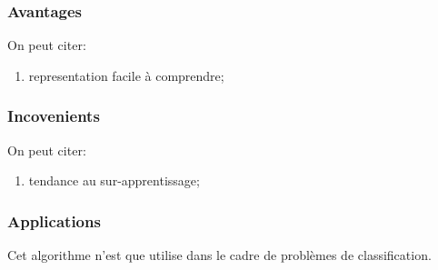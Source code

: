 \documentclass{article}
\begin{document}
\subsubsection{Avantages}
On peut citer:
\begin{enumerate}[noitemsep, rightmargin=\leftmargin]
    \item representation facile à comprendre;
\end{enumerate}

\subsubsection{Incovenients}
On peut citer:
\begin{enumerate}[noitemsep, rightmargin=\leftmargin]
    \item tendance au sur-apprentissage;
\end{enumerate}

\subsubsection{Applications}
Cet algorithme n'est que utilise dans le cadre de problèmes de classification.




\end{document}
